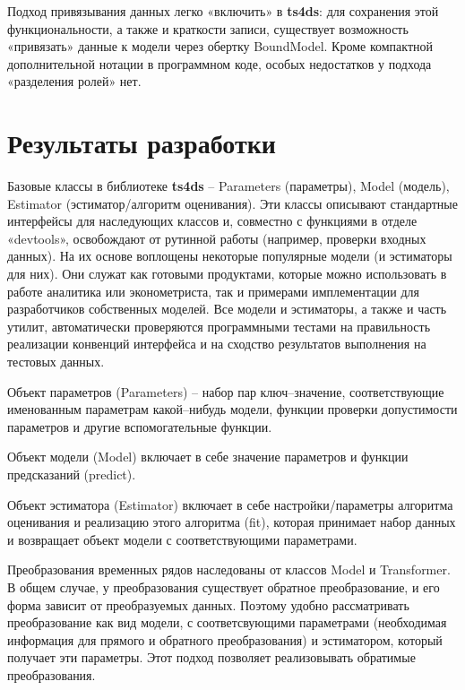 \documentclass[../report.tex]{subfiles}
\begin{document}
	Подход привязывания данных легко «включить» в \textbf{ts4ds}: для сохранения этой функциональности, а также и краткости записи, существует возможность «привязать» данные к модели через обертку BoundModel. Кроме компактной дополнительной нотации в программном коде, особых недостатков у подхода «разделения ролей» нет.
	
	\section{Результаты разработки}
	
	Базовые классы в библиотеке \textbf{ts4ds} – Parameters (параметры), Model (модель), Estimator (эстиматор/алгоритм оценивания). Эти классы описывают стандартные интерфейсы для наследующих классов и, совместно с функциями в отделе «devtools», освобождают от рутинной работы (например, проверки входных данных). На их основе воплощены некоторые популярные модели (и эстиматоры для них). Они служат как готовыми продуктами, которые можно использовать в работе аналитика или эконометриста, так и примерами имплементации для разработчиков собственных моделей. Все модели и эстиматоры, а также и часть утилит, автоматически проверяются программными тестами на правильность реализации конвенций интерфейса и на сходство результатов выполнения на тестовых данных.
	
	
	Объект параметров (Parameters) – набор пар ключ–значение, соответствующие именованным параметрам какой–нибудь модели, функции проверки допустимости параметров и другие вспомогательные функции.
	
	Объект модели (Model) включает в себе значение параметров и функции предсказаний (predict).
	
	Объект эстиматора (Estimator) включает в себе настройки/параметры алгоритма оценивания и реализацию этого алгоритма (fit), которая принимает набор данных и возвращает объект модели с соответствующими параметрами.
	
	
	Преобразования временных рядов наследованы от классов Model и Transformer. В общем случае, у преобразования существует обратное преобразование, и его форма зависит от преобразуемых данных. Поэтому удобно рассматривать преобразование как вид модели, с соответсвующими параметрами (необходимая информация для прямого и обратного преобразования) и эстиматором, который получает эти параметры. Этот подход позволяет реализовывать обратимые преобразования.
	
\end{document}
